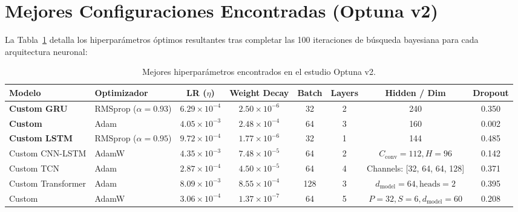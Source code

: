 \section{Mejores Configuraciones Encontradas (Optuna v2)}
\label{sec:ap_mejores_configs}

La Tabla~\ref{tab:optuna_mejores_valores} detalla los hiperparámetros óptimos resultantes tras completar las 100 iteraciones de búsqueda bayesiana para cada arquitectura neuronal:

\begin{table}[H]
\centering
\caption{Mejores hiperparámetros encontrados en el estudio Optuna v2.}
\label{tab:optuna_mejores_valores}
\scriptsize
\begin{tabularx}{\linewidth}{@{}lXcccccc@{}}
\toprule
\textbf{Modelo} & \textbf{Optimizador} & \textbf{LR ($\eta$)} & \textbf{Weight Decay} & \textbf{Batch} & \textbf{Layers} & \textbf{Hidden / Dim} & \textbf{Dropout} \\
\midrule
\textbf{Custom GRU} & RMSprop ($\alpha=0.93$) & $6.29 \times 10^{-4}$ & $2.50 \times 10^{-6}$ & 32 & 2 & 240 & 0.350 \\
\textbf{Custom \xlstm{}} & Adam & $4.05 \times 10^{-3}$ & $2.48 \times 10^{-4}$ & 64 & 3 & 160 & 0.002 \\
\textbf{Custom LSTM} & RMSprop ($\alpha=0.95$) & $9.72 \times 10^{-4}$ & $1.77 \times 10^{-6}$ & 32 & 1 & 144 & 0.485 \\
Custom CNN-LSTM & AdamW & $4.35 \times 10^{-3}$ & $7.48 \times 10^{-5}$ & 64 & 2 & $C_{\text{conv}}=112, H=96$ & 0.142 \\
Custom TCN & Adam & $2.87 \times 10^{-4}$ & $4.50 \times 10^{-5}$ & 64 & 4 & Channels: [32, 64, 64, 128] & 0.371 \\
Custom Transformer & Adam & $8.09 \times 10^{-3}$ & $8.55 \times 10^{-4}$ & 128 & 3 & $d_{\text{model}}=64, \text{heads}=2$ & 0.395 \\
Custom \patchtst{} & AdamW & $3.06 \times 10^{-4}$ & $1.37 \times 10^{-7}$ & 64 & 5 & $P=32, S=6, d_{\text{model}}=60$ & 0.208 \\
\bottomrule
\end{tabularx}
\end{table}
